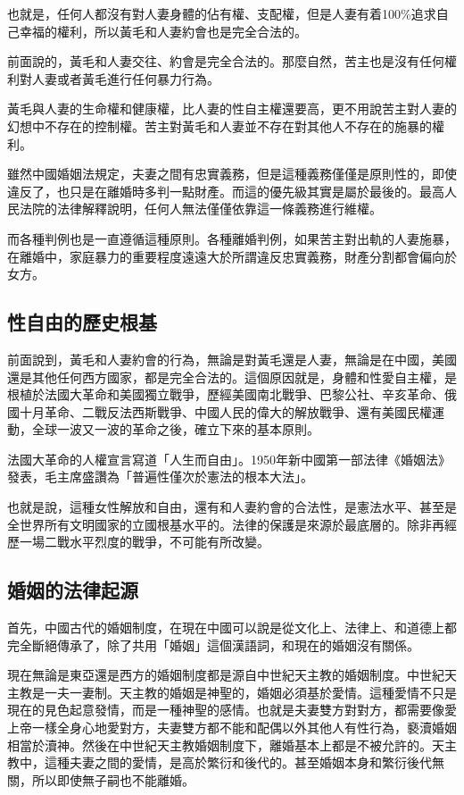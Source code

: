 也就是，任何人都沒有對人妻身體的佔有權、支配權，但是人妻有着100\%追求自己幸福的權利，所以黃毛和人妻約會也是完全合法的。

前面說的，黃毛和人妻交往、約會是完全合法的。那麼自然，苦主也是沒有任何權利對人妻或者黃毛進行任何暴力行為。

黃毛與人妻的生命權和健康權，比人妻的性自主權還要高，更不用說苦主對人妻的幻想中不存在的控制權。苦主對黃毛和人妻並不存在對其他人不存在的施暴的權利。

雖然中國婚姻法規定，夫妻之間有忠實義務，但是這種義務僅僅是原則性的，即使違反了，也只是在離婚時多判一點財產。而這的優先級其實是屬於最後的。最高人民法院的法律解釋說明，任何人無法僅僅依靠這一條義務進行維權。

而各種判例也是一直遵循這種原則。各種離婚判例，如果苦主對出軌的人妻施暴，在離婚中，家庭暴力的重要程度遠遠大於所謂違反忠實義務，財產分割都會偏向於女方。

\subsection{性自由的歷史根基}

前面說到，黃毛和人妻約會的行為，無論是對黃毛還是人妻，無論是在中國，美國還是其他任何西方國家，都是完全合法的。這個原因就是，身體和性愛自主權，是根植於法國大革命和美國獨立戰爭，歷經美國南北戰爭、巴黎公社、辛亥革命、俄國十月革命、二戰反法西斯戰爭、中國人民的偉大的解放戰爭、還有美國民權運動，全球一波又一波的革命之後，確立下來的基本原則。

法國大革命的人權宣言寫道「人生而自由」。1950年新中國第一部法律《婚姻法》發表，毛主席盛讚為「普遍性僅次於憲法的根本大法」。

也就是說，這種女性解放和自由，還有和人妻約會的合法性，是憲法水平、甚至是全世界所有文明國家的立國根基水平的。法律的保護是來源於最底層的。除非再經歷一場二戰水平烈度的戰爭，不可能有所改變。

\subsection{婚姻的法律起源}

首先，中國古代的婚姻制度，在現在中國可以說是從文化上、法律上、和道德上都完全斷絕傳承了，除了共用「婚姻」這個漢語詞，和現在的婚姻沒有關係。

現在無論是東亞還是西方的婚姻制度都是源自中世紀天主教的婚姻制度。中世紀天主教是一夫一妻制。天主教的婚姻是神聖的，婚姻必須基於愛情。這種愛情不只是現在的見色起意發情，而是一種神聖的感情。也就是夫妻雙方對對方，都需要像愛上帝一樣全身心地愛對方，夫妻雙方都不能和配偶以外其他人有性行為，褻瀆婚姻相當於瀆神。然後在中世紀天主教婚姻制度下，離婚基本上都是不被允許的。天主教中，這種夫妻之間的愛情，是高於繁衍和後代的。甚至婚姻本身和繁衍後代無關，所以即使無子嗣也不能離婚。

